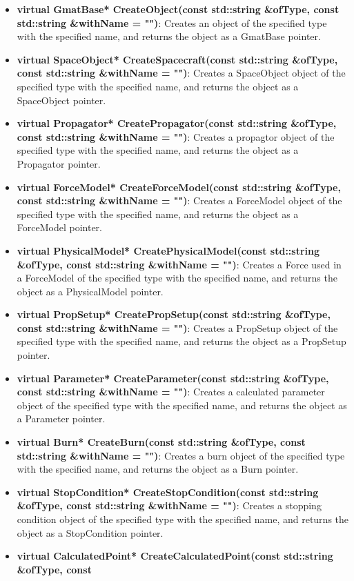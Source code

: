 \begin{itemize}
\item \textbf{virtual GmatBase* CreateObject(const std::string \&ofType, const std::string
\&withName = "")}:  Creates an object of the specified type with the specified name, and returns
the object as a GmatBase pointer.
\item \textbf{virtual SpaceObject* CreateSpacecraft(const std::string \&ofType, const std::string
\&withName = "")}:  Creates a SpaceObject object of the specified type with the specified
name, and returns the object as a SpaceObject pointer.
\item \textbf{virtual Propagator* CreatePropagator(const std::string \&ofType, const std::string
\&withName = "")}:  Creates a propagtor object of the specified type with the specified name, and
returns the object as a Propagator pointer.
\item \textbf{virtual ForceModel* CreateForceModel(const std::string \&ofType, const std::string
\&withName = "")}:  Creates a ForceModel object of the specified type with the specified name, and
returns the object as a ForceModel pointer.
\item \textbf{virtual PhysicalModel* CreatePhysicalModel(const std::string \&ofType, const
std::string \&withName = "")}:  Creates a Force used in a ForceModel of the specified type
with the specified name, and returns the object as a PhysicalModel pointer.
\item \textbf{virtual PropSetup* CreatePropSetup(const std::string \&ofType, const std::string
\&withName = "")}:  Creates a PropSetup object of the specified type with the specified name, and
returns the object as a PropSetup pointer.
\item \textbf{virtual Parameter* CreateParameter(const std::string \&ofType, const std::string
\&withName = "")}:  Creates a calculated parameter object of the specified type with the specified
name, and returns the object as a Parameter pointer.
\item \textbf{virtual Burn* CreateBurn(const std::string \&ofType, const std::string \&withName =
"")}:  Creates a burn object of the specified type with the specified name, and returns
the object as a Burn pointer.
\item \textbf{virtual StopCondition* CreateStopCondition(const std::string \&ofType, const
std::string \&withName = "")}:  Creates a stopping condition object of the specified type with the
specified name, and returns the object as a StopCondition pointer.
\item \textbf{virtual CalculatedPoint* CreateCalculatedPoint(const std::string \&ofType, const
}
\end{itemize}
